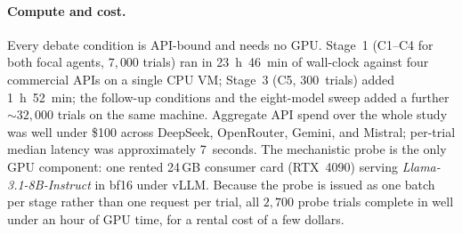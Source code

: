 \documentclass[11pt]{article}
\begin{document}
\paragraph{Compute and cost.}
Every debate condition is API-bound and needs no GPU.
Stage~1 (C1--C4 for both focal agents, $7{,}000$ trials) ran in
23~h~46~min of wall-clock against four commercial APIs on a single
CPU VM; Stage~3 (C5, 300~trials) added 1~h~52~min; the follow-up
conditions and the eight-model sweep added a further ${\sim}32{,}000$
trials on the same machine.
Aggregate API spend over the whole study was well under \$100 across
DeepSeek, OpenRouter, Gemini, and Mistral; per-trial median latency
was approximately 7~seconds.
The mechanistic probe is the only GPU component: one rented 24\,GB
consumer card (RTX~4090) serving \textit{Llama-3.1-8B-Instruct} in bf16 under
vLLM.
Because the probe is issued as one batch per stage rather than one request per
trial, all $2{,}700$ probe trials complete in well under an hour of GPU time,
for a rental cost of a few dollars.
\end{document}
